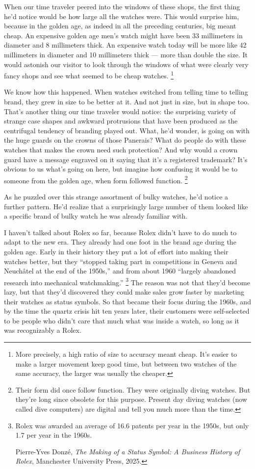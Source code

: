 \documentclass[12pt]{book}
\begin{document}
When our time traveler peered into the windows of these shops, the first
thing he'd notice would be how large all the watches were. This would
surprise him, because in the golden age, as indeed in all the preceding
centuries, big meant cheap. An expensive golden age men's watch might
have been 33 millimeters in diameter and 8 millimeters thick. An
expensive watch today will be more like 42 millimeters in diameter and
10 millimeters thick --- more than double the size. It would astonish
our visitor to look through the windows of what were clearly very fancy
shops and see what seemed to be cheap watches. \footnote{More precisely, a high ratio of size to accuracy meant cheap.
It's easier to make a larger movement keep good time, but between two
watches of the same accuracy, the larger was usually the cheaper.}

We know how this happened. When watches switched from telling time to
telling brand, they grew in size to be better at it. And not just in
size, but in shape too. That's another thing our time traveler would
notice: the surprising variety of strange case shapes and awkward
protrusions that have been produced as the centrifugal tendency of
branding played out. What, he'd wonder, is going on with the huge guards
on the crowns of those Panerais? What do people do with these watches
that makes the crown need such protection? And why would a crown guard
have a message engraved on it saying that it's a registered trademark?
It's obvious to us what's going on here, but imagine how confusing it
would be to someone from the golden age, when form followed function.
\footnote{Their form did once follow function. They were originally
diving watches. But they're long since obsolete for this purpose.
Present day diving watches (now called dive computers) are digital and
tell you much more than the time.}

As he puzzled over this strange assortment of bulky watches, he'd notice
a further pattern. He'd realize that a surprisingly large number of them
looked like a specific brand of bulky watch he was already familiar
with.

I haven't talked about Rolex so far, because Rolex didn't have to do
much to adapt to the new era. They already had one foot in the brand age
during the golden age. Early in their history they put a lot of effort
into making their watches better, but they ``stopped taking part in
competitions in Geneva and Neuchâtel at the end of the 1950s,'' and from
about 1960 ``largely abandoned research into mechanical watchmaking.''
\footnote{Rolex was awarded an average of 16.6 patents per year in the
1950s, but only 1.7 per year in the 1960s.

Pierre-Yves Donzé, \emph{The Making of a Status Symbol: A Business
History of Rolex}, Manchester University Press, 2025.} The reason was not that they'd become lazy,
but that they'd discovered they could make sales grow faster by
marketing their watches as status symbols. So that became their focus
during the 1960s, and by the time the quartz crisis hit ten years later,
their customers were self-selected to be people who didn't care that
much what was inside a watch, so long as it was recognizably a Rolex.
\end{document}
